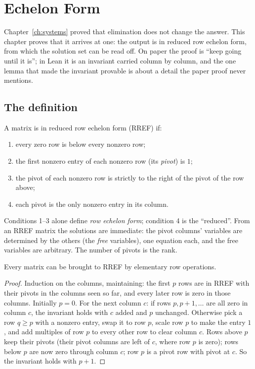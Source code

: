 \chapter{Echelon Form}\label{ch:echelon}

Chapter~\ref{ch:systems} proved that elimination does not change the answer. This chapter proves
that it arrives at one: the output is in reduced row echelon form, from which the solution set can
be read off. On paper the proof is ``keep going until it is''; in Lean it is an invariant carried
column by column, and the one lemma that made the invariant provable is about a detail the paper
proof never mentions.

\section{The definition}

\begin{definition}
  A matrix is in reduced row echelon form (RREF) if:
  \begin{enumerate}[nosep]
    \item every zero row is below every nonzero row;
    \item the first nonzero entry of each nonzero row (its \emph{pivot}) is $1$;
    \item the pivot of each nonzero row is strictly to the right of the pivot of the row above;
    \item each pivot is the only nonzero entry in its column.
  \end{enumerate}
\end{definition}

Conditions 1--3 alone define \emph{row echelon form}; condition 4 is the ``reduced''. From an
RREF matrix the solutions are immediate: the pivot columns' variables are determined by the
others (the \emph{free} variables), one equation each, and the free variables are arbitrary. The
number of pivots is the rank.

\begin{theorem}[Existence]
  Every matrix can be brought to RREF by elementary row operations.
\end{theorem}
\begin{proof}
  Induction on the columns, maintaining: the first $p$ rows are in RREF with their pivots in
  the columns seen so far, and every later row is zero in those columns. Initially $p = 0$. For
  the next column $c$: if rows $p, p+1, \ldots$ are all zero in column $c$, the invariant holds
  with $c$ added and $p$ unchanged. Otherwise pick a row $q \ge p$ with a nonzero entry, swap it
  to row $p$, scale row $p$ to make the entry $1$, and add multiples of row $p$ to every other row
  to clear column $c$. Rows above $p$ keep their pivots (their pivot columns are left of $c$,
  where row $p$ is zero); rows below $p$ are now zero through column $c$; row $p$ is a pivot row
  with pivot at $c$. So the invariant holds with $p + 1$.
\end{proof}

